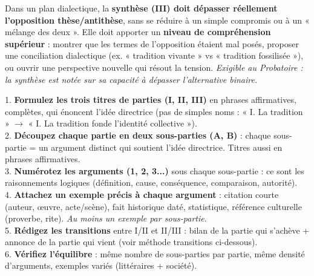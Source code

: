 \documentclass[11pt]{article}
\begin{document}
\begin{propriete}
Dans un plan dialectique, la \textbf{synthèse (III) doit dépasser réellement l'opposition thèse/antithèse}, sans se réduire à un simple compromis ou à un « mélange des deux ». Elle doit apporter un \textbf{niveau de compréhension supérieur} : montrer que les termes de l'opposition étaient mal posés, proposer une conciliation dialectique (ex. « tradition vivante » vs « tradition fossilisée »), ou ouvrir une perspective nouvelle qui résout la tension. \emph{Exigible au Probatoire : la synthèse est notée sur sa capacité à dépasser l'alternative binaire.}
\end{propriete}

\begin{methode}
1. \textbf{Formulez les trois titres de parties (I, II, III)} en phrases affirmatives, complètes, qui énoncent l'idée directrice (pas de simples noms : « I. La tradition » $\rightarrow$ « I. La tradition fonde l'identité collective »).\\
2. \textbf{Découpez chaque partie en deux sous-parties (A, B)} : chaque sous-partie = un argument distinct qui soutient l'idée directrice. Titres aussi en phrases affirmatives.\\
3. \textbf{Numérotez les arguments (1, 2, 3...)} sous chaque sous-partie : ce sont les raisonnements logiques (définition, cause, conséquence, comparaison, autorité).\\
4. \textbf{Attachez un exemple précis à chaque argument} : citation courte (auteur, œuvre, acte/scène), fait historique daté, statistique, référence culturelle (proverbe, rite). \emph{Au moins un exemple par sous-partie}.\\
5. \textbf{Rédigez les transitions} entre I/II et II/III : bilan de la partie qui s'achève + annonce de la partie qui vient (voir méthode transitions ci-dessous).\\
6. \textbf{Vérifiez l'équilibre} : même nombre de sous-parties par partie, même densité d'arguments, exemples variés (littéraires + société).
\end{methode}
\end{document}

